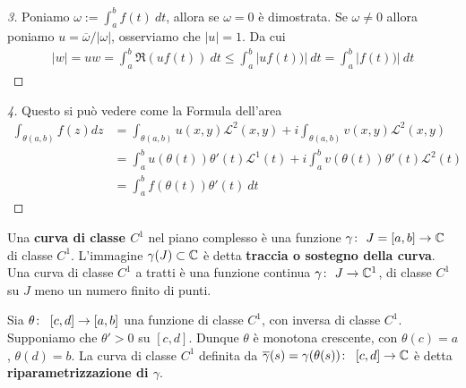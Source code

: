 \begin{proof}[3]
	Poniamo $\omega := \int_{a}^{b} f(t)\ dt$, allora se $\omega = 0$ è dimostrata. Se $\omega \neq 0$ allora poniamo $u = \overline{\omega}/|\omega|$, osserviamo che $|u|=1$. Da cui
	\begin{equation*}
	\begin{aligned}
		|w| = uw = \int_{a}^b \Re(uf(t))\ dt \le \int_{a}^b |uf(t))|\ dt = \int_{a}^b |f(t))|\ dt  
	\end{aligned}
	\end{equation*}
\end{proof}

\begin{proof}[4]
	Questo si può vedere come la Formula dell'area  
	\begin{equation*}
	\begin{aligned}
		\int_{\theta(a,b)} f(z) dz & = \int_{\theta(a,b)} u(x,y) \mathcal{L}^2(x,y)
											+ i\int_{\theta(a,b)} v(x,y) \mathcal{L}^2(x,y)\\
						   & = \int_a^b u(\theta(t))\theta'(t) \mathcal{L}^1(t) 
						   + i\int^b_a v(\theta(t))\theta'(t) \mathcal{L}^2(t)\\
						   & = \int_a^b f(\theta(t)) \theta'(t)\ dt		
		\end{aligned}
	\end{equation*}
\end{proof}

\begin{definition}
	\label{defn:curva-c1}
	Una \textbf{curva di classe $C^1$} nel piano complesso è una funzione $\gamma \colon\ J=\left[a,b\right] \rightarrow \mathbb{C}$ di classe $C^1$. L'immagine $\gamma(J) \subset \mathbb{C}$ è detta \textbf{traccia o sostegno della curva}. Una curva di classe $C^1$ a tratti è una funzione continua $\gamma \colon\ J \rightarrow \mathbb{C}^1$, di classe $C^1$ su $J$ meno un numero finito di punti.\\ 		
\end{definition}

\begin{definition}
	\label{defn:riparametrizzazione-curva-classe-c1}
	Sia $\theta \colon\ \left[c,d\right] \rightarrow \left[a,b\right]$ una funzione di classe $C^1$, con inversa di classe $C^1$. Supponiamo che $\theta' > 0$ su $\left[c, d\right]$. Dunque $\theta$ è monotona crescente, con $\theta(c) = a$, $\theta(d) = b$. La curva di classe $C^1$ definita da $\overline{\gamma}(s) = \gamma(\theta (s)) \colon\ \left[c,d\right] \rightarrow \mathbb{C}$ è detta \textbf{riparametrizzazione di $\gamma$}.
\end{definition}

